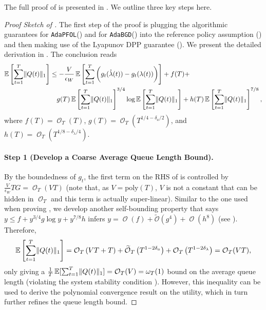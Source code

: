\documentclass[11pt,fullpage,letterpaper]{article} %
\renewcommand{\bm}[1]{#1}%
\renewcommand{\tilde}{\widetilde}
\renewcommand{\O}{\operatorname{\mathcal O}}
\newcommand{\Otil}{\operatorname{\tilde{\mathcal O}}}
\newcommand{\E}{\operatornamewithlimits{\mathbb{E}}}
\newcommand{\OLOAlg}{\texttt{AdaPFOL}\xspace}
\newcommand{\BCOAlg}{\texttt{AdaBGD}\xspace}
\begin{document}
The full proof of  is presented in .
We outline three key steps here.
\begin{proof}[Proof Sketch of ]
The first step of the proof is plugging the algorithmic guarantees for \OLOAlg () and for \BCOAlg () into the reference policy assumption () and then making use of the Lyapunov DPP guarantee (). We present the detailed derivation in . The conclusion reads
\begin{align}
\E\left [\sum_{t=1}^T \lVert \bm Q(t)\rVert_1\right ]&\le -\frac{V}{\epsilon_W} \E\left [\sum_{t=1}^T \bigg (g_t(\mathring{\bm \lambda}(t)) - g_t(\bm \lambda(t))\bigg )\right ] + f(T) + \nonumber\\
&\quad g(T) \E\left [\sum_{t=1}^T \lVert \bm Q(t)\rVert_1\right ]^{3/4} \log \E \left [\sum_{t=1}^T \lVert \bm Q(t)\rVert_1\right ] + h(T) \E \left [\sum_{t=1}^T \lVert \bm Q(t)\rVert_1\right ]^{7/8},\label{eq:multi-hop utility self-bounding informal}
\end{align}
where $f(T)=\O_T(T)$, $g(T)=\O_T(T^{1/4-\delta_a/2})$, and $h(T)=\O_T(T^{1/8-\delta_\lambda/4})$.

\paragraph{Step 1 (Develop a Coarse Average Queue Length Bound).} By the boundedness of $g_t$, the first term on the RHS of  is controlled by $\frac{V}{\epsilon_W} T G=\O_T(VT)$ (note that, as $V=\text{poly}(T)$, $V$ is not a constant that can be hidden in $\O_T$ and this term is actually super-linear).
Similar to the one used when proving , we develop another self-bounding property that says $y\le f+y^{3/4}g\log y +y^{7/8}h$ infers $y=\O(f)+\Otil(g^{4}) + \O(h^8)$ (see ). Therefore,
\begin{equation*}
\E\left [\sum_{t=1}^T \lVert \bm Q(t)\rVert_1\right ]=\O_T\left (VT + T\right ) + \Otil_T\left (T^{1-2\delta_a}\right ) + \O_T\left (T^{1 - 2 \delta_\lambda}\right )=\O_T(VT),
\end{equation*}
only giving a $\frac 1T\E[\sum_{t=1}^T \lVert \bm Q(t)\rVert_1]=\O_T(V)=\omega_T(1)$ bound on the average queue length (violating the system stability condition ). However, this inequality can be used to derive the polynomial convergence result on the utility, which in turn further refines the queue length bound.


\end{proof}
\end{document}
